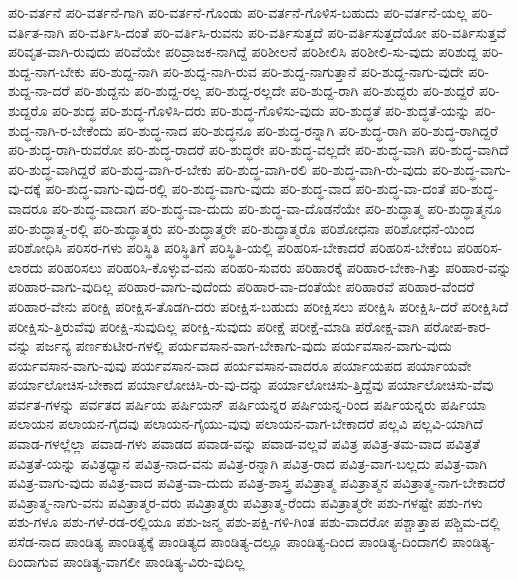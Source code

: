 {ಪರಿ-ವರ್ತನೆ
ಪರಿ-ವರ್ತನೆ-ಗಾಗಿ
ಪರಿ-ವರ್ತನೆ-ಗೊಂಡು
ಪರಿ-ವರ್ತನೆ-ಗೊಳಿಸ-ಬಹುದು
ಪರಿ-ವರ್ತನೆ-ಯಲ್ಲ
ಪರಿ-ವರ್ತಿತ-ನಾಗಿ
ಪರಿ-ವರ್ತಿಸಿ-ದಂತೆ
ಪರಿ-ವರ್ತಿಸಿ-ರುವನು
ಪರಿ-ವರ್ತಿಸುತ್ತದೆ
ಪರಿ-ವರ್ತಿಸುತ್ತದೆಯೋ
ಪರಿ-ವರ್ತಿಸುತ್ತವೆ
ಪರಿವೃತ-ವಾಗಿ-ರುವುದು
ಪರಿವೆಯೇ
ಪರಿವ್ರಾಜಕ-ನಾಗಿದ್ದೆ
ಪರಿಶೀಲನೆ
ಪರಿಶೀಲಿಸಿ
ಪರಿಶೀಲಿ-ಸು-ವುದು
ಪರಿಶುದ್ದ
ಪರಿ-ಶುದ್ದ-ನಾಗ-ಬೇಕು
ಪರಿ-ಶುದ್ದ-ನಾಗಿ
ಪರಿ-ಶುದ್ದ-ನಾಗಿ-ರುವ
ಪರಿ-ಶುದ್ದ-ನಾಗುತ್ತಾನೆ
ಪರಿ-ಶುದ್ದ-ನಾಗು-ವುದೇ
ಪರಿ-ಶುದ್ದ-ನಾ-ದರೆ
ಪರಿ-ಶುದ್ದನು
ಪರಿ-ಶುದ್ದ-ರಲ್ಲ
ಪರಿ-ಶುದ್ದ-ರಲ್ಲದೇ
ಪರಿ-ಶುದ್ದ-ರಾಗಿ
ಪರಿ-ಶುದ್ದರು
ಪರಿ-ಶುದ್ದರೆ
ಪರಿ-ಶುದ್ದರೊ
ಪರಿ-ಶುದ್ಧ
ಪರಿ-ಶುದ್ಧ-ಗೊಳಿಸಿ-ದರು
ಪರಿ-ಶುದ್ಧ-ಗೊಳಿಸು-ವುದು
ಪರಿ-ಶುದ್ಧತೆ
ಪರಿ-ಶುದ್ಧತೆ-ಯನ್ನು
ಪರಿ-ಶುದ್ಧ-ನಾಗಿ-ರ-ಬೇಕೆಂದು
ಪರಿ-ಶುದ್ಧ-ನಾದ
ಪರಿ-ಶುದ್ಧನೂ
ಪರಿ-ಶುದ್ಧ-ರನ್ನಾಗಿ
ಪರಿ-ಶುದ್ಧ-ರಾಗಿ
ಪರಿ-ಶುದ್ಧ-ರಾಗಿದ್ದರೆ
ಪರಿ-ಶುದ್ಧ-ರಾಗಿ-ರುವರೋ
ಪರಿ-ಶುದ್ಧ-ರಾದರೆ
ಪರಿ-ಶುದ್ಧರೇ
ಪರಿ-ಶುದ್ಧ-ವಲ್ಲದೇ
ಪರಿ-ಶುದ್ಧ-ವಾಗಿ
ಪರಿ-ಶುದ್ಧ-ವಾಗಿದೆ
ಪರಿ-ಶುದ್ಧ-ವಾಗಿದ್ದರೆ
ಪರಿ-ಶುದ್ಧ-ವಾಗಿ-ರ-ಬೇಕು
ಪರಿ-ಶುದ್ಧ-ವಾಗಿ-ರಲಿ
ಪರಿ-ಶುದ್ಧ-ವಾಗಿ-ರು-ವುದು
ಪರಿ-ಶುದ್ಧ-ವಾಗು-ವು-ದಕ್ಕೆ
ಪರಿ-ಶುದ್ಧ-ವಾಗು-ವುದ-ರಲ್ಲಿ
ಪರಿ-ಶುದ್ಧ-ವಾಗು-ವುದು
ಪರಿ-ಶುದ್ಧ-ವಾದ
ಪರಿ-ಶುದ್ಧ-ವಾ-ದಂತೆ
ಪರಿ-ಶುದ್ಧ-ವಾದರೂ
ಪರಿ-ಶುದ್ಧ-ವಾದಾಗ
ಪರಿ-ಶುದ್ಧ-ವಾ-ದುದು
ಪರಿ-ಶುದ್ಧ-ವಾ-ದೊಡನೆಯೇ
ಪರಿ-ಶುದ್ಧಾತ್ಮ
ಪರಿ-ಶುದ್ಧಾತ್ಮನೂ
ಪರಿ-ಶುದ್ಧಾತ್ಮ-ರಲ್ಲಿ
ಪರಿ-ಶುದ್ಧಾತ್ಮರು
ಪರಿ-ಶುದ್ಧಾತ್ಮರೇ
ಪರಿ-ಶುದ್ಧಾತ್ಮರೊ
ಪರಿಶೋಧನಾ
ಪರಿಶೋಧನೆ-ಯಿಂದ
ಪರಿಶೋಧಿಸಿ
ಪರಿಸರ-ಗಳು
ಪರಿಸ್ಥಿತಿ
ಪರಿಸ್ಥಿತಿಗೆ
ಪರಿಸ್ಥಿತಿ-ಯಲ್ಲಿ
ಪರಿಹರಿಸ-ಬೇಕಾದರೆ
ಪರಿಹರಿಸ-ಬೇಕೆಂಬ
ಪರಿಹರಿಸ-ಲಾರದು
ಪರಿಹರಿಸಲು
ಪರಿಹರಿಸಿ-ಕೊಳ್ಳುವ-ವನು
ಪರಿಹರಿ-ಸುವರು
ಪರಿಹಾರಕ್ಕೆ
ಪರಿಹಾರ-ಬೇಕಾ-ಗಿತ್ತು
ಪರಿಹಾರ-ವನ್ನು
ಪರಿಹಾರ-ವಾಗು-ವುದಿಲ್ಲ
ಪರಿಹಾರ-ವಾಗು-ವುದೆಂದು
ಪರಿಹಾರ-ವಾ-ದಂತೆಯೇ
ಪರಿಹಾರವೆ
ಪರಿಹಾರ-ವೆಂದರೆ
ಪರಿಹಾರ-ವೇನು
ಪರೀಕ್ಷಿ
ಪರೀಕ್ಷಿಸ-ತೊಡಗಿ-ದರು
ಪರೀಕ್ಷಿಸ-ಬಹುದು
ಪರೀಕ್ಷಿಸಲು
ಪರೀಕ್ಷಿಸಿ
ಪರೀಕ್ಷಿಸಿ-ದರೆ
ಪರೀಕ್ಷಿಸಿದೆ
ಪರೀಕ್ಷಿಸು-ತ್ತಿರುವೆವು
ಪರೀಕ್ಷಿ-ಸುವುದಿಲ್ಲ
ಪರೀಕ್ಷಿ-ಸುವುದು
ಪರೀಕ್ಷೆ
ಪರೀಕ್ಷೆ-ಮಾಡಿ
ಪರೋಕ್ಷ-ವಾಗಿ
ಪರೋಪ-ಕಾರ-ವನ್ನು
ಪರ್ಜನ್ಯ
ಪರ್ಣಕುಟೀರ-ಗಳಲ್ಲಿ
ಪರ್ಯವಸಾನ-ವಾಗ-ಬೇಕಾಗು-ವುದು
ಪರ್ಯವಸಾನ-ವಾಗು-ವುದು
ಪರ್ಯವಸಾನ-ವಾಗು-ವುವು
ಪರ್ಯವಸಾನ-ವಾದ
ಪರ್ಯವಸಾನ-ವಾದರೂ
ಪರ್ಯಾಯಪದ
ಪರ್ಯಾಯವೇ
ಪರ್ಯಾಲೋಚಿಸ-ಬೇಕಾದ
ಪರ್ಯಾಲೋಚಿಸಿ-ರು-ವು-ದನ್ನು
ಪರ್ಯಾಲೋಚಿಸು-ತ್ತಿದ್ದೆವು
ಪರ್ಯಾಲೋಚಿಸು-ವೆವು
ಪರ್ವತ-ಗಳನ್ನು
ಪರ್ವತದ
ಪರ್ಷಿಯ
ಪರ್ಷಿಯನ್
ಪರ್ಷಿಯನ್ನರ
ಪರ್ಷಿಯನ್ನ-ರಿಂದ
ಪರ್ಷಿಯನ್ನರು
ಪರ್ಷಿಯಾ
ಪಲಾಯನ
ಪಲಾಯನ-ಗೈದವು
ಪಲಾಯನ-ಗೈಯು-ವುವು
ಪಲಾಯನ-ವಾಗ-ಬೇಕಾದರೆ
ಪಲ್ಲವಿ
ಪಲ್ಲವಿ-ಯಾಗಿದೆ
ಪವಾಡ-ಗಳಲ್ಲೆಲ್ಲಾ
ಪವಾಡ-ಗಳು
ಪವಾಡದ
ಪವಾಡ-ವನ್ನು
ಪವಾಡ-ವಲ್ಲವೆ
ಪವಿತ್ರ
ಪವಿತ್ರ-ತಮ-ವಾದ
ಪವಿತ್ರತೆ
ಪವಿತ್ರತೆ-ಯನ್ನು
ಪವಿತ್ರಧ್ಯಾನ
ಪವಿತ್ರ-ನಾದ-ವನು
ಪವಿತ್ರ-ರನ್ನಾಗಿ
ಪವಿತ್ರ-ರಾದ
ಪವಿತ್ರ-ವಾಗ-ಬಲ್ಲದು
ಪವಿತ್ರ-ವಾಗಿ
ಪವಿತ್ರ-ವಾಗು-ವುದು
ಪವಿತ್ರ-ವಾದ
ಪವಿತ್ರ-ವಾ-ದುದು
ಪವಿತ್ರ-ಶಾಸ್ತ್ರ
ಪವಿತ್ರಾತ್ಮ
ಪವಿತ್ರಾತ್ಮನ
ಪವಿತ್ರಾತ್ಮ-ನಾಗ-ಬೇಕಾದರೆ
ಪವಿತ್ರಾತ್ಮ-ನಾಗು-ವನು
ಪವಿತ್ರಾತ್ಮರ-ವರು
ಪವಿತ್ರಾತ್ಮರು
ಪವಿತ್ರಾತ್ಮ-ರೆಂದು
ಪವಿತ್ರಾತ್ಮರೇ
ಪಶು-ಗಳಷ್ಟೇ
ಪಶು-ಗಳು
ಪಶು-ಗಳೂ
ಪಶು-ಗಳೆ-ರಡ-ರಲ್ಲಿಯೂ
ಪಶು-ಜನ್ಮ
ಪಶು-ಪಕ್ಷಿ-ಗಳಿ-ಗಿಂತ
ಪಶು-ವಾದರೋ
ಪಶ್ಚಾತ್ತಾಪ
ಪಶ್ಚಿಮ-ದಲ್ಲಿ
ಪಸೆಡ-ನಾದ
ಪಾಂಡಿತ್ಯ
ಪಾಂಡಿತ್ಯಕ್ಕೆ
ಪಾಂಡಿತ್ಯದ
ಪಾಂಡಿತ್ಯ-ದಲ್ಲೂ
ಪಾಂಡಿತ್ಯ-ದಿಂದ
ಪಾಂಡಿತ್ಯ-ದಿಂದಾಗಲಿ
ಪಾಂಡಿತ್ಯ-ದಿಂದಾಗುವ
ಪಾಂಡಿತ್ಯ-ವಾಗಲೀ
ಪಾಂಡಿತ್ಯ-ವಿರು-ವುದಿಲ್ಲ
}
